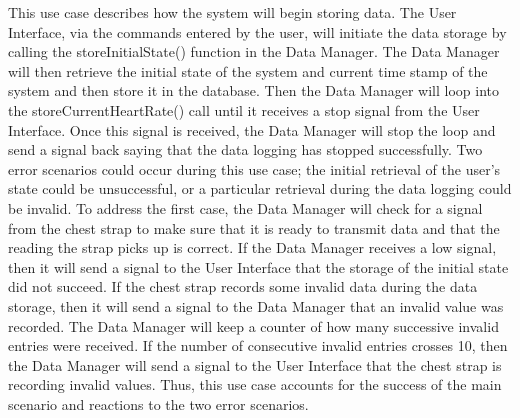 \documentclass[letterpaper,english, 12pt]{scrreprt}
\begin{document}
This use case describes how the system will begin storing data. The User Interface, via the commands entered by the user, will initiate the data storage by calling the storeInitialState() function in the Data Manager. The Data Manager will then retrieve the initial state of the system and current time stamp of the system and then store it in the database. Then the Data Manager will loop into the storeCurrentHeartRate() call until it receives a stop signal from the User Interface. Once this signal is received, the Data Manager will stop the loop and send a signal back saying that the data logging has stopped successfully. Two error scenarios could occur during this use case; the initial retrieval of the user's state could be unsuccessful, or a particular retrieval during the data logging could be invalid. To address the first case, the Data Manager will check for a signal from the chest strap to make sure that it is ready to transmit data and that the reading the strap picks up is correct. If the Data Manager receives a low signal, then it will send a signal to the User Interface that the storage of the initial state did not succeed. If the chest strap records some invalid data during the data storage, then it will send a signal to the Data Manager that an invalid value was recorded. The Data Manager will keep a counter of how many successive invalid entries were received. If the number of consecutive invalid entries crosses 10, then the Data Manager will send a signal to the User Interface that the chest strap is recording invalid values. Thus, this use case accounts for the success of the main scenario and reactions to the two error scenarios. \\
\end{document}
